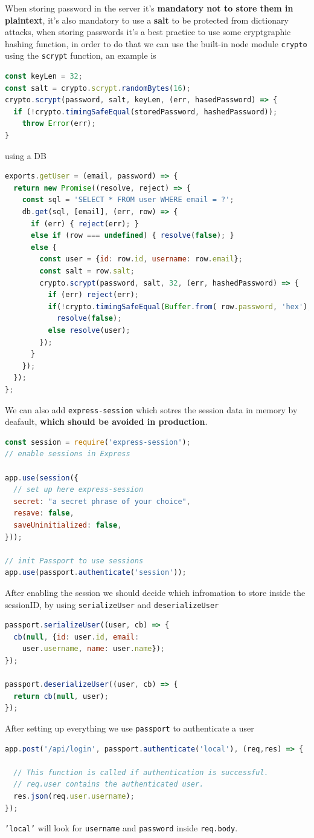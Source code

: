\documentclass[12pt]{article}
\begin{document}
When storing password in the server it's \textbf{mandatory not to store them in plaintext}, it's also mandatory to use a \textbf{salt} to be protected from dictionary attacks, when storing passwords it's a best practice to use some cryptgraphic hashing function, in order to do that we can use the built-in node module \texttt{crypto} using the \texttt{scrypt} function, an example is
\begin{lstlisting}[language=js]
const keyLen = 32;
const salt = crypto.scrypt.randomBytes(16);
crypto.scrypt(password, salt, keyLen, (err, hasedPassword) => {
  if (!crypto.timingSafeEqual(storedPassword, hashedPassword));
    throw Error(err);
}
\end{lstlisting}
using a DB
\begin{lstlisting}[language=js]
exports.getUser = (email, password) => {
  return new Promise((resolve, reject) => {
    const sql = 'SELECT * FROM user WHERE email = ?';
    db.get(sql, [email], (err, row) => {
      if (err) { reject(err); }
      else if (row === undefined) { resolve(false); }
      else {
        const user = {id: row.id, username: row.email};
        const salt = row.salt;
        crypto.scrypt(password, salt, 32, (err, hashedPassword) => {
          if (err) reject(err);
          if(!crypto.timingSafeEqual(Buffer.from( row.password, 'hex'), hashedPassword))
            resolve(false);
          else resolve(user);
        });
      }
    });
  });
};
\end{lstlisting}
We can also add \texttt{express-session} which sotres the session data in memory by deafault, \textbf{which should be avoided in production}.
\begin{lstlisting}[language=js]
const session = require('express-session');
// enable sessions in Express

app.use(session({
  // set up here express-session
  secret: "a secret phrase of your choice",
  resave: false,
  saveUninitialized: false,
}));

// init Passport to use sessions
app.use(passport.authenticate('session'));
\end{lstlisting}
After enabling the session we should decide which infromation to store inside the sessionID, by using \texttt{serializeUser} and \texttt{deserializeUser}
\begin{lstlisting}[language=js]
passport.serializeUser((user, cb) => {
  cb(null, {id: user.id, email:
    user.username, name: user.name});
});

passport.deserializeUser((user, cb) => {
  return cb(null, user);
});
\end{lstlisting}
After setting up everything we use \texttt{passport} to authenticate a user
\begin{lstlisting}[language=js]
app.post('/api/login', passport.authenticate('local'), (req,res) => {

  // This function is called if authentication is successful.
  // req.user contains the authenticated user.
  res.json(req.user.username);
});
\end{lstlisting}
\texttt{'local'} will look for \texttt{username} and \texttt{password} inside \texttt{req.body}.
\end{document}
